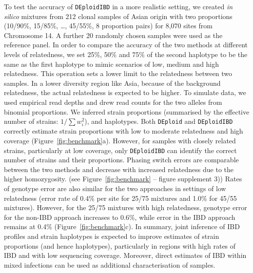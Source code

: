 \documentclass[9pt,lineno]{elife}
\begin{document}
To test the accuracy of \texttt{DEploidIBD} in a more realistic setting, we created {\it in silico} mixtures from 212 clonal samples of Asian origin with two proportions (10/90\%, 15/85\%, \dots, 45/55\%, 8 proportion pairs) for 8,070 sites from Chromosome 14.  A further 20 randomly chosen samples were used as the reference panel. In order to compare the accuracy of the two methods at different levels of relatedness, we set 25\%, 50\% and 75\% of the second haplotype to be the same as the first haplotype to mimic scenarios of low, medium and high relatedness. This operation sets a lower limit to the relatedness between two samples. In a lower diversity region like Asia, because of the background relatedness, the actual relatedness is expected to be higher.  To simulate data, we used empirical read depths and drew read counts for the two alleles from binomial proportions.  We inferred strain proportions (summarised by the effective number of strains: $1/\sum w_{i}^{2}$), and haplotypes.  Both \texttt{DEploid} and \texttt{DEploidIBD} correctly estimate strain proportions with low to moderate relatedness and high coverage (Figure~\ref{fig:benchmark}a).  However, for samples with closely related strains, particularly at low coverage, only \texttt{DEploidIBD} can identify the correct number of strains and their proportions.  Phasing switch errors are comparable between the two methods and decrease with increased relatedness due to the higher homozygosity. (see Figure~\ref{fig:benchmark} -- figure supplement 3)) Rates of genotype error are also similar for the two approaches in settings of low relatedness (error rate of 0.4\% per site for 25/75 mixtures and 1.0\% for 45/55 mixtures).  However, for the 25/75 mixtures with high relatedness, genotype error for the non-IBD approach increases to 0.6\%, while error in the IBD approach remains at 0.4\% (Figure~\ref{fig:benchmark}c).  In summary, joint inference of IBD profiles and strain haplotypes is expected to improve estimates of strain proportions (and hence haplotypes), particularly in regions with high rates of IBD and with low sequencing coverage.  Moreover, direct estimates of IBD within mixed infections can be used as additional characterisation of samples.
\end{document}
